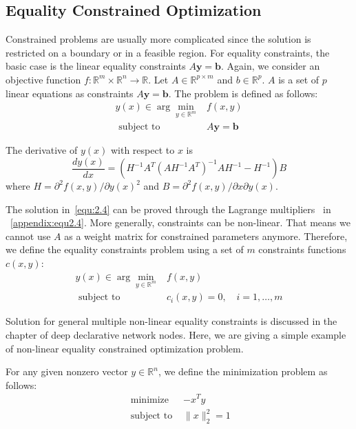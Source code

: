 \subsection{Equality Constrained Optimization}
\label{sec:equ-opt}
Constrained problems are usually more complicated since the solution is restricted on a boundary or in a feasible region. For equality constraints, the basic case is the linear equality constraints $A \boldsymbol{y} = \boldsymbol{b}$. Again, we consider an objective function $f: \mathbb{R}^{m} \times \mathbb{R}^{n} \rightarrow \mathbb{R}$. Let $A \in \mathbb{R}^{p \times m}$ and $b \in \mathbb{R}^{p}$. $A$ is a set of $p$ linear equations as constraints $A \boldsymbol{y} = \boldsymbol{b}$. The problem is defined as follows:
$$
\begin{array}{rl}y(x) \in \arg \min _{y \in \mathbb{R}^{m}} & f(x, y) \\ \textrm { subject to } & A \boldsymbol{y}=\boldsymbol{b}\end{array}
$$
\par The derivative of $y(x)$ with respect to $x$ is
\begin{equation}
    \label{equ:2.4}
    \frac{dy(x)}{dx} = \left(H^{-1} A^{T}\left(A H^{-1} A^{T}\right)^{-1} A H^{-1}-H^{-1}\right) B
\end{equation}
where $H = \partial^{2} f(x, y) / \partial y(x)^2$ and $B = \partial^{2} f(x, y) / \partial x \partial y(x)$. 
\par The solution in~\ref{equ:2.4} can be proved through the Lagrange multipliers~\citep{BD:14} in ~\ref{appendix:equ2.4}. 
More generally, constraints can be non-linear. That means we cannot use $A$ as a weight matrix for constrained parameters anymore. Therefore, we define the equality constraints problem using a set of $m$ constraints functions $c(x, y)$: 
$$
\begin{array}{rl}y(x) \in \arg \min _{y \in \mathbb{R}^{m}} & f(x, y) \\ \textrm { subject to } & c_i(x, y) = 0, \quad i = 1, \dots, m \end{array}
$$
\par Solution for general multiple non-linear equality constraints is discussed in the chapter of deep declarative network nodes. Here, we are giving a simple example of non-linear equality constrained optimization problem. 
\par For any given nonzero vector $y \in \mathbb{R}^n$, we define the minimization problem as follows:
$$
\begin{array}{cc}\textrm { minimize } & -x^{T} y \\ \textrm { subject to } & \|x\|_{2}^{2}=1\end{array}
$$

